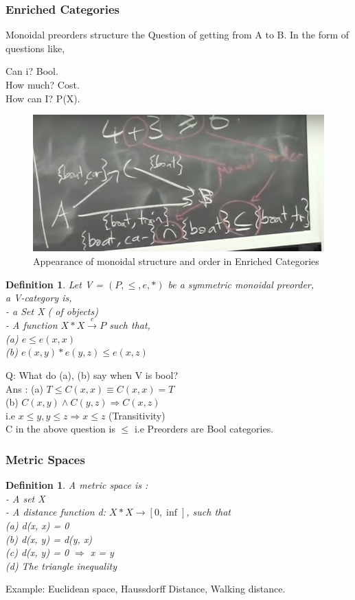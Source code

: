 \documentclass{article}
\newtheorem{defn}[thm]{Definition} %
\begin{document}
\subsubsection{Enriched Categories}
Monoidal preorders structure the Question of getting from A to B. 
In the form of questions like, 
\begin{center}
    Can i? Bool.\\
    How much? Cost.\\
    How can I? P(X).
\end{center}
\begin{figure}[]
    \centering
    \includegraphics[scale=0.5]{./images/8.jpg}
    \caption{Appearance of monoidal structure and order in Enriched Categories}
    \label{fig:my_label}
\end{figure}
\begin{defn}
    Let V = $(P, \leq, e, *)$ be a symmetric monoidal preorder, \\
    a V-category is, \\
    - a Set X ( of objects)\\
    - A function $X * X \xrightarrow{e} P$
    such that, \\
    (a) $e \leq e(x, x)$\\
    (b) $e(x,y)*e(y,z) \leq e(x, z)$
 \end{defn}
 Q: What do (a), (b) say when V is bool?\\
 Ans : (a) $ T \leq C(x,x) \equiv C(x, x) = T$\\
       (b) $C(x, y) \wedge C(y,z) \Rightarrow C(x,z)$\\
     i.e $ x \leq y, y \leq z \Rightarrow x \leq z$ (Transitivity)\\
C in the above question is $\leq$ i.e Preorders are Bool categories. 

\subsubsection{Metric Spaces}
\begin{defn}
    A metric space is : \\
    - A set X \\
    - A distance function d: $X*X \rightarrow [0, \inf]$, 
    such that \\
    (a) d(x, x) = 0 \\
    (b) d(x, y) = d(y, x)\\
    (c) d(x, y) = 0 $\Rightarrow$ x = y \\
    (d) The triangle inequality
\end{defn}
Example: Euclidean space, Haussdorff Distance, Walking distance. 
\end{document}
